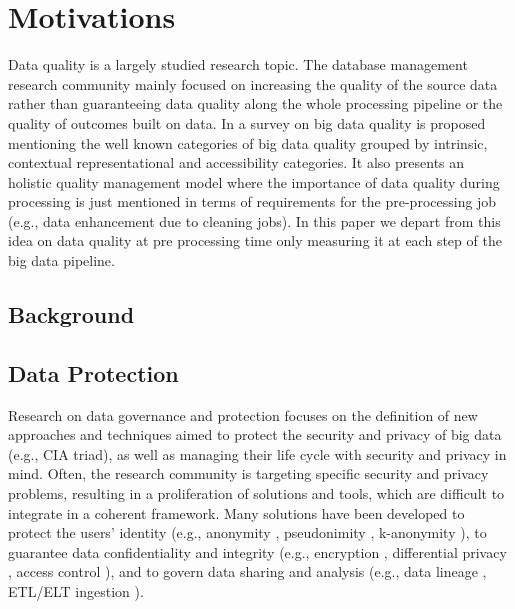 \section{Motivations}
Data quality is a largely studied research topic. The database management research community mainly focused on increasing the quality of the source data rather than guaranteeing data quality along the whole processing pipeline or the quality of outcomes built on data.
In \cite{BigDataQaulitySurvey} a survey on big data quality is proposed mentioning the well known categories of big data quality grouped by intrinsic,
contextual representational and accessibility categories.
It also presents an holistic quality management model where the importance of data quality during processing is just mentioned in terms of requirements for the pre-processing job (e.g., data enhancement due to cleaning jobs).
In this paper we depart from this idea on data quality at pre processing time only measuring it at each step of the big data pipeline.

\subsection{Background}
\subsection{Data Protection}
Research on data governance and protection focuses on the definition of new approaches and techniques aimed to protect the security and privacy of big data (e.g., CIA triad), as well as managing their life cycle with security and privacy in mind. Often, the research community is targeting specific security and privacy problems, resulting in a proliferation of solutions and tools, which are difficult to integrate in a coherent framework. Many solutions have been developed to protect the users' identity (e.g., anonymity \cite{wallace1999anonymity}, pseudonimity \cite{pfitzmann2001pseudonymity}, k-anonymity \cite{k-anon}), to guarantee data confidentiality and integrity (e.g., encryption \cite{thambiraja2012survey}, differential privacy \cite{hassan2019differential}, access control \cite{tolone2005access,servos2017current}), and to govern data sharing and analysis (e.g., data lineage \cite{woodruff1997supporting}, ETL/ELT ingestion \cite{vassiliadis2009survey}).

